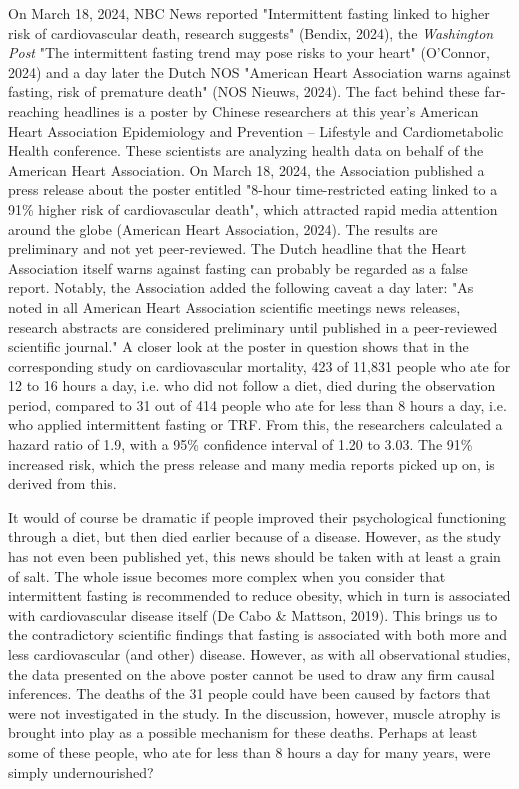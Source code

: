 \documentclass[authordate, reflection,issue]{jote-new-article}
\begin{document}
On March 18, 2024, NBC News reported "Intermittent fasting linked to higher risk of cardiovascular death, research suggests" (Bendix, 2024), the \emph{Washington Post} "The intermittent fasting trend may pose risks to your heart" (O'Connor, 2024) and a day later the Dutch NOS "American Heart Association warns against fasting, risk of premature death" (NOS Nieuws, 2024). The fact behind these far-reaching headlines is a poster by Chinese researchers at this year's American Heart Association Epidemiology and Prevention -- Lifestyle and Cardiometabolic Health conference. These scientists are analyzing health data on behalf of the American Heart Association. On March 18, 2024, the Association published a press release about the poster entitled "8-hour time-restricted eating linked to a 91\% higher risk of cardiovascular death", which attracted rapid media attention around the globe (American Heart Association, 2024). The results are preliminary and not yet peer-reviewed. The Dutch headline that the Heart Association itself warns against fasting can probably be regarded as a false report. Notably, the Association added the following caveat a day later: "As noted in all American Heart Association scientific meetings news releases, research abstracts are considered preliminary until published in a peer-reviewed scientific journal." A closer look at the poster in question shows that in the corresponding study on cardiovascular mortality, 423 of 11,831 people who ate for 12 to 16 hours a day, i.e. who did not follow a diet, died during the observation period, compared to 31 out of 414 people who ate for less than 8 hours a day, i.e. who applied intermittent fasting or TRF. From this, the researchers calculated a hazard ratio of 1.9, with a 95\% confidence interval of 1.20 to 3.03. The 91\% increased risk, which the press release and many media reports picked up on, is derived from this.







It would of course be dramatic if people improved their psychological functioning through a diet, but then died earlier because of a disease. However, as the study has not even been published yet, this news should be taken with at least a grain of salt. The whole issue becomes more complex when you consider that intermittent fasting is recommended to reduce obesity, which in turn is associated with cardiovascular disease itself (De Cabo \& Mattson, 2019). This brings us to the contradictory scientific findings that fasting is associated with both more and less cardiovascular (and other) disease. However, as with all observational studies, the data presented on the above poster cannot be used to draw any firm causal inferences. The deaths of the 31 people could have been caused by factors that were not investigated in the study. In the discussion, however, muscle atrophy is brought into play as a possible mechanism for these deaths. Perhaps at least some of these people, who ate for less than 8 hours a day for many years, were simply undernourished?
\end{document}

